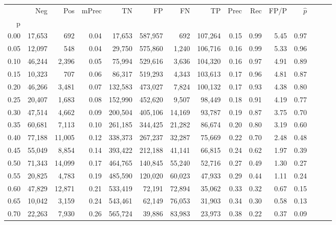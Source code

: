 \begin{tabular}{rrrrrrrrrrrrrrr}
\toprule
{} &     Neg &     Pos & mPrec &       TN &       FP &       FN &       TP &  Prec &   Rec &  FP/P & $\hat{p}$ \\
p    &         &         &       &          &          &          &          &       &       &       &           \\
\midrule
0.00 &  17,653 &     692 &  0.04 &   17,653 &  587,957 &      692 &  107,264 &  0.15 &  0.99 &  5.45 &      0.97 \\
0.05 &  12,097 &     548 &  0.04 &   29,750 &  575,860 &    1,240 &  106,716 &  0.16 &  0.99 &  5.33 &      0.96 \\
0.10 &  46,244 &   2,396 &  0.05 &   75,994 &  529,616 &    3,636 &  104,320 &  0.16 &  0.97 &  4.91 &      0.89 \\
0.15 &  10,323 &     707 &  0.06 &   86,317 &  519,293 &    4,343 &  103,613 &  0.17 &  0.96 &  4.81 &      0.87 \\
0.20 &  46,266 &   3,481 &  0.07 &  132,583 &  473,027 &    7,824 &  100,132 &  0.17 &  0.93 &  4.38 &      0.80 \\
0.25 &  20,407 &   1,683 &  0.08 &  152,990 &  452,620 &    9,507 &   98,449 &  0.18 &  0.91 &  4.19 &      0.77 \\
0.30 &  47,514 &   4,662 &  0.09 &  200,504 &  405,106 &   14,169 &   93,787 &  0.19 &  0.87 &  3.75 &      0.70 \\
0.35 &  60,681 &   7,113 &  0.10 &  261,185 &  344,425 &   21,282 &   86,674 &  0.20 &  0.80 &  3.19 &      0.60 \\
0.40 &  77,188 &  11,005 &  0.12 &  338,373 &  267,237 &   32,287 &   75,669 &  0.22 &  0.70 &  2.48 &      0.48 \\
0.45 &  55,049 &   8,854 &  0.14 &  393,422 &  212,188 &   41,141 &   66,815 &  0.24 &  0.62 &  1.97 &      0.39 \\
0.50 &  71,343 &  14,099 &  0.17 &  464,765 &  140,845 &   55,240 &   52,716 &  0.27 &  0.49 &  1.30 &      0.27 \\
0.55 &  20,825 &   4,783 &  0.19 &  485,590 &  120,020 &   60,023 &   47,933 &  0.29 &  0.44 &  1.11 &      0.24 \\
0.60 &  47,829 &  12,871 &  0.21 &  533,419 &   72,191 &   72,894 &   35,062 &  0.33 &  0.32 &  0.67 &      0.15 \\
0.65 &  10,042 &   3,159 &  0.24 &  543,461 &   62,149 &   76,053 &   31,903 &  0.34 &  0.30 &  0.58 &      0.13 \\
0.70 &  22,263 &   7,930 &  0.26 &  565,724 &   39,886 &   83,983 &   23,973 &  0.38 &  0.22 &  0.37 &      0.09 \\

\end{tabular}
